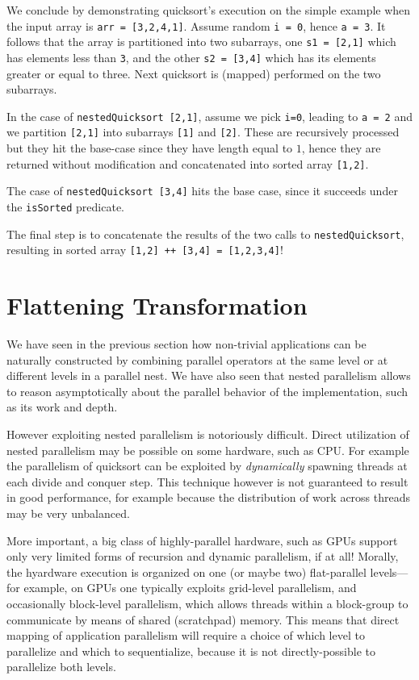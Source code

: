 \documentclass[acmsmall,review]{acmart}\settopmatter{printfolios=true,printccs=false,printacmref=false}
\begin{document}
We conclude by demonstrating quicksort's execution on the simple example when
the input array is {\tt arr = [3,2,4,1]}. 
Assume random {\tt i = 0}, hence {\tt a = 3}. It follows that the array is 
partitioned into two subarrays, one {\tt s1 = [2,1]} which has elements less 
than {\tt 3}, and the other {\tt s2 = [3,4]} which has its elements greater
or equal to three. Next quicksort is (mapped) performed on the two subarrays.

In the case of {\tt nestedQuicksort [2,1]}, assume we pick {\tt i=0}, leading
to {\tt a = 2} and we partition {\tt [2,1]} into subarrays {\tt [1]} and {\tt [2]}.
These are recursively processed but they hit the base-case since they have length
equal to $1$, hence they are returned without modification and concatenated into
sorted array {\tt [1,2]}.

The case of {\tt nestedQuicksort [3,4]} hits the base case, since it succeeds
under the {\tt isSorted} predicate.

The final step is to concatenate the results of the two calls to {\tt nestedQuicksort},
resulting in sorted array {\tt [1,2] ++ [3,4] = [1,2,3,4]}!

\newpage
\section{Flattening Transformation}
\label{sec:flattening}

We have seen in the previous section how non-trivial applications
can be naturally constructed by combining parallel operators at the
same level or at different levels in a parallel nest. We have also
seen that nested parallelism allows to reason asymptotically about 
the parallel behavior of the implementation, such as its work and 
depth. 

However exploiting nested parallelism is notoriously difficult.
Direct utilization of nested parallelism may be possible on some
hardware, such as CPU. For example the parallelism of quicksort
can be exploited by \emph{dynamically} spawning threads at each
divide and conquer step. This technique however is not guaranteed
to result in good performance, for example because the distribution
of work across threads may be very unbalanced.

More important, a big class of highly-parallel hardware, such as
GPUs support only very limited forms of recursion and dynamic
parallelism, if at all! Morally, the hyardware execution is organized 
on one (or maybe two) flat-parallel levels---for example, on GPUs 
one typically exploits grid-level parallelism, and occasionally
block-level parallelism, which allows threads within a block-group
to communicate by means of shared (scratchpad) memory. This means
that direct mapping of application parallelism will require a choice
of which level to parallelize and which to sequentialize, because 
it is not directly-possible to parallelize both levels. 
\end{document}
